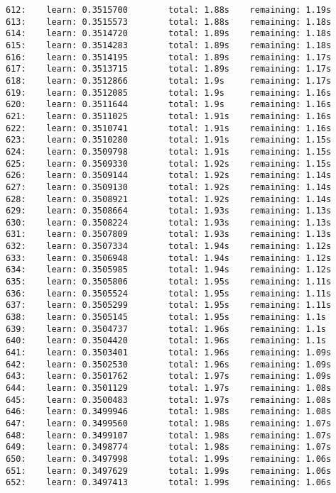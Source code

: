 \documentclass[11pt]{article}
\begin{document}
\begin{Verbatim}[commandchars=\\\{\}]
612:    learn: 0.3515700        total: 1.88s    remaining: 1.19s
613:    learn: 0.3515573        total: 1.88s    remaining: 1.18s
614:    learn: 0.3514720        total: 1.89s    remaining: 1.18s
615:    learn: 0.3514283        total: 1.89s    remaining: 1.18s
616:    learn: 0.3514195        total: 1.89s    remaining: 1.17s
617:    learn: 0.3513715        total: 1.89s    remaining: 1.17s
618:    learn: 0.3512866        total: 1.9s     remaining: 1.17s
619:    learn: 0.3512085        total: 1.9s     remaining: 1.16s
620:    learn: 0.3511644        total: 1.9s     remaining: 1.16s
621:    learn: 0.3511025        total: 1.91s    remaining: 1.16s
622:    learn: 0.3510741        total: 1.91s    remaining: 1.16s
623:    learn: 0.3510280        total: 1.91s    remaining: 1.15s
624:    learn: 0.3509798        total: 1.91s    remaining: 1.15s
625:    learn: 0.3509330        total: 1.92s    remaining: 1.15s
626:    learn: 0.3509144        total: 1.92s    remaining: 1.14s
627:    learn: 0.3509130        total: 1.92s    remaining: 1.14s
628:    learn: 0.3508921        total: 1.92s    remaining: 1.14s
629:    learn: 0.3508664        total: 1.93s    remaining: 1.13s
630:    learn: 0.3508224        total: 1.93s    remaining: 1.13s
631:    learn: 0.3507809        total: 1.93s    remaining: 1.13s
632:    learn: 0.3507334        total: 1.94s    remaining: 1.12s
633:    learn: 0.3506948        total: 1.94s    remaining: 1.12s
634:    learn: 0.3505985        total: 1.94s    remaining: 1.12s
635:    learn: 0.3505806        total: 1.95s    remaining: 1.11s
636:    learn: 0.3505524        total: 1.95s    remaining: 1.11s
637:    learn: 0.3505299        total: 1.95s    remaining: 1.11s
638:    learn: 0.3505145        total: 1.95s    remaining: 1.1s
639:    learn: 0.3504737        total: 1.96s    remaining: 1.1s
640:    learn: 0.3504420        total: 1.96s    remaining: 1.1s
641:    learn: 0.3503401        total: 1.96s    remaining: 1.09s
642:    learn: 0.3502530        total: 1.96s    remaining: 1.09s
643:    learn: 0.3501762        total: 1.97s    remaining: 1.09s
644:    learn: 0.3501129        total: 1.97s    remaining: 1.08s
645:    learn: 0.3500483        total: 1.97s    remaining: 1.08s
646:    learn: 0.3499946        total: 1.98s    remaining: 1.08s
647:    learn: 0.3499560        total: 1.98s    remaining: 1.07s
648:    learn: 0.3499107        total: 1.98s    remaining: 1.07s
649:    learn: 0.3498774        total: 1.98s    remaining: 1.07s
650:    learn: 0.3497998        total: 1.99s    remaining: 1.06s
651:    learn: 0.3497629        total: 1.99s    remaining: 1.06s
652:    learn: 0.3497413        total: 1.99s    remaining: 1.06s

\end{Verbatim}
\end{document}
